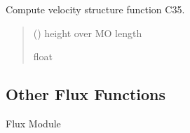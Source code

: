 \documentclass[letterpaper,10pt,english]{sphinxmanual}
\begin{document}
\begin{fulllineitems}
\label{\detokenize{users_guide:AirSeaFluxCode.flux_subs.stratification.psiu_26}}
\pysigstartsignatures
\pysiglinewithargsret
{}
{\sphinxparamcomma {}}
{}
\pysigstopsignatures
\sphinxAtStartPar
Compute velocity structure function C35.
\begin{quote}\begin{description}
\sphinxAtStartPar
{} () \textendash{} height over MO length

\sphinxAtStartPar
{}

\sphinxAtStartPar
float

\end{description}\end{quote}

\end{fulllineitems}



\subsection{Other Flux Functions}
\label{\detokenize{users_guide:module-AirSeaFluxCode.flux_subs}}\label{\detokenize{users_guide:other-flux-functions}}
\sphinxAtStartPar
Flux Module
\end{document}
